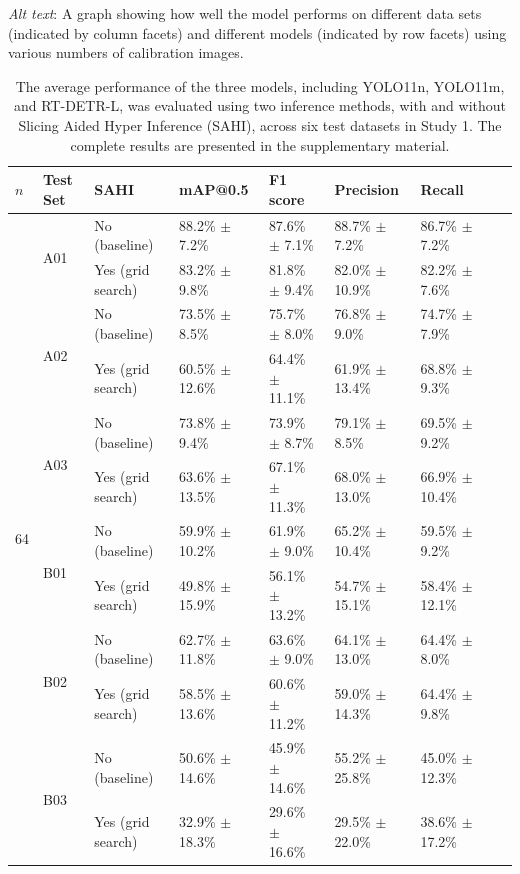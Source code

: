 \textit{Alt text}: A graph showing how well the model performs on different data sets (indicated by column facets) and different models (indicated by row facets) using various numbers of calibration images.

\begin{table}[H]
    \centering
    \caption{The average performance of the three models, including YOLO11n, YOLO11m, and RT-DETR-L, was evaluated using two inference methods, with and without Slicing Aided Hyper Inference (SAHI), across six test datasets in Study 1. The complete results are presented in the supplementary material.}
    \label{tab:s1_results}
    \small
    \begin{tabular}{lllllllll}
        \toprule
        \textbf{$n$} & \textbf{Test Set} & \textbf{SAHI} & \textbf{mAP@0.5} & \textbf{F1 score} & \textbf{Precision} & \textbf{Recall} \\

        \toprule

            \multirow{12}{*}{64} & \multirow{2}{*}{A01} & No (baseline) & 88.2\% $\pm$ 7.2\% & 87.6\% $\pm$ 7.1\% & 88.7\% $\pm$ 7.2\% & 86.7\% $\pm$ 7.2\% \\
            & & Yes (grid search) & 83.2\% $\pm$ 9.8\% & 81.8\% $\pm$ 9.4\% & 82.0\% $\pm$ 10.9\% & 82.2\% $\pm$ 7.6\% \\
            \cmidrule{2-7}
            & \multirow{2}{*}{A02} & No (baseline) & 73.5\% $\pm$ 8.5\% & 75.7\% $\pm$ 8.0\% & 76.8\% $\pm$ 9.0\% & 74.7\% $\pm$ 7.9\% \\
            & & Yes (grid search) & 60.5\% $\pm$ 12.6\% & 64.4\% $\pm$ 11.1\% & 61.9\% $\pm$ 13.4\% & 68.8\% $\pm$ 9.3\% \\
            \cmidrule{2-7}
            & \multirow{2}{*}{A03} & No (baseline) & 73.8\% $\pm$ 9.4\% & 73.9\% $\pm$ 8.7\% & 79.1\% $\pm$ 8.5\% & 69.5\% $\pm$ 9.2\% \\
            & & Yes (grid search) & 63.6\% $\pm$ 13.5\% & 67.1\% $\pm$ 11.3\% & 68.0\% $\pm$ 13.0\% & 66.9\% $\pm$ 10.4\% \\
            \cmidrule{2-7}
            & \multirow{2}{*}{B01} & No (baseline) & 59.9\% $\pm$ 10.2\% & 61.9\% $\pm$ 9.0\% & 65.2\% $\pm$ 10.4\% & 59.5\% $\pm$ 9.2\% \\
            & & Yes (grid search) & 49.8\% $\pm$ 15.9\% & 56.1\% $\pm$ 13.2\% & 54.7\% $\pm$ 15.1\% & 58.4\% $\pm$ 12.1\% \\
            \cmidrule{2-7}
            & \multirow{2}{*}{B02} & No (baseline) & 62.7\% $\pm$ 11.8\% & 63.6\% $\pm$ 9.0\% & 64.1\% $\pm$ 13.0\% & 64.4\% $\pm$ 8.0\% \\
            & & Yes (grid search) & 58.5\% $\pm$ 13.6\% & 60.6\% $\pm$ 11.2\% & 59.0\% $\pm$ 14.3\% & 64.4\% $\pm$ 9.8\% \\
            \cmidrule{2-7}
            & \multirow{2}{*}{B03} & No (baseline) & 50.6\% $\pm$ 14.6\% & 45.9\% $\pm$ 14.6\% & 55.2\% $\pm$ 25.8\% & 45.0\% $\pm$ 12.3\% \\
            & & Yes (grid search) & 32.9\% $\pm$ 18.3\% & 29.6\% $\pm$ 16.6\% & 29.5\% $\pm$ 22.0\% & 38.6\% $\pm$ 17.2\% \\


\end{tabular}
\end{table}
